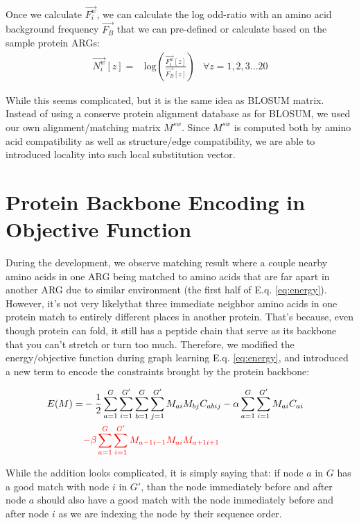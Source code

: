 Once we calculate $\overrightarrow{F^w_i}$, we can calculate the log odd-ratio with an amino acid background frequency $\overrightarrow{F_B}$ that we can pre-defined or calculate based on the sample protein ARGs:
\begin{align} 
\overrightarrow{N^w_i}[z] = & \text{log}(\frac{\overrightarrow{F^w_i}[z]}{\overrightarrow{F_B}[z]}) & \forall z=1,2,3...20
\end{align}

While this seems complicated, but it is the same idea as BLOSUM matrix. Instead of using a conserve protein alignment database as for BLOSUM, we used our own alignment/matching matrix $M^{sw}$. Since $M^{sw}$ is computed both by amino acid compatibility as well as structure/edge compatibility, we are able to introduced locality into such local substitution vector.

\section{Protein Backbone Encoding in Objective Function}

During the development, we observe matching result where a couple nearby amino acids in one ARG being matched to amino acids that are far apart in another ARG due to similar environment (the first half of E.q. \ref{eq:energy}).\\

However, it's not very likely\footnotemark that three immediate neighbor amino acids in one protein match to entirely different places in another protein. That's because, even though protein can fold, it still has a peptide chain that serve as its backbone that you can't stretch or turn too much. Therefore, we modified the energy/objective function during graph learning E.q. \ref{eq:energy}, and introduced a new term to encode the constraints brought by the protein backbone:

\begin{align}
E(M)=&-\frac{1}{2}\sum_{a=1}^{G}\sum_{i=1}^{G'}\sum_{b=1}^{G}\sum_{j=1}^{G'}M_{ai}M_{bj}C_{abij}-\alpha\sum_{a=1}^{G}\sum_{i=1}^{G'}M_{ai}C_{ai}\nonumber\\
&\color{red}{-\beta\sum_{a=1}^{G}\sum_{i=1}^{G'}M_{a-1i-1}M_{ai}M_{a+1i+1}}&
\end{align}

While the addition looks complicated, it is simply saying that: if node $a$ in $G$ has a good match with node $i$ in $G'$, than the node immediately before and after node $a$ should also have a good match with the node immediately before and after node $i$ as we are indexing the node by their sequence order.

